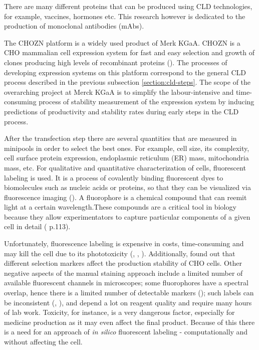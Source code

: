 There are many different proteins that can be produced using CLD technologies, for example, vaccines, hormones etc. This research however is dedicated to the production of monoclonal antibodies (mAbs). 

The CHOZN\raisebox{1ex}{\small{\textregistered}} platform is a widely used product of Merk KGaA. CHOZN\raisebox{1ex}{\small{\textregistered}} is a CHO mammalian cell expression system for fast and easy selection and growth of clones producing high levels of recombinant proteins (\cite{chozn}). The processes of developing expression systems on this platform correspond to the general CLD process described in the previous subsection \ref{section:cld-steps}. The scope of the overarching project at Merck KGaA is to simplify the labour-intensive and time-consuming process of stability measurement of the expression system by inducing predictions of productivity and stability rates during early steps in the CLD process. 

After the transfection step there are several quantities that are measured in minipools in order to select the best ones. For example, cell size, its complexity, cell surface protein expression, endoplasmic reticulum (ER) mass, mitochondria mass, etc. For qualitative and quantitative characterization of cells, fluorescent labeling is used. It is a process of covalently binding fluorescent dyes to biomolecules such as nucleic acids or proteins, so that they can be visualized via fluorescence imaging (\cite{fluorescent_labeling}). A fluorophore is a chemical compound that can reemit light at a certain wavelength.These compounds are a critical tool in biology because they allow experimentators to capture particular components of a given cell in detail (\cite{DL_for_LS} p.113). 

Unfortunately, fluorescence labeling is expensive in costs, time-consuming and may kill the cell due to its phototoxicity (\cite{Fried_1982}, \cite{Patil_2018}, \cite{Progatzky_2013}). Additionally, \cite{Yeo_2017} found out that different selection markers affect the production stability of CHO cells. Other negative aspects of the manual staining approach include a limited number of available fluorescent channels in microscopes; some fluorophores have a spectral overlap, hence there is a limited number of detectable markers (\cite{Perfetto_2004}); such labels can be inconsistent (\cite{Burry_2011}, \cite{Weigert_1970}), and depend a lot on reagent quality and require many hours of lab work. Toxicity, for instance, is a very dangerous factor, especially for medicine production as it may even affect the final product. Because of this there is a need for an approach of \textit{in silico} fluorescent labeling - computationally and without affecting the cell. 

